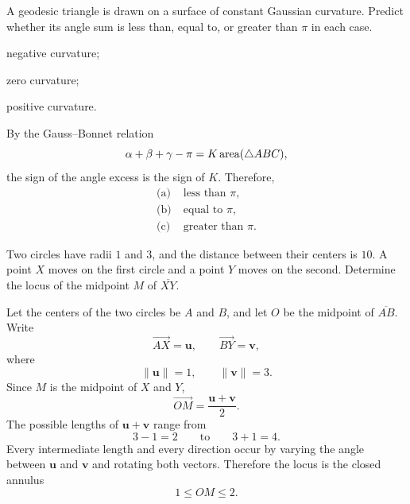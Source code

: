 
    \begin{expectedproblem}
        A geodesic triangle is drawn on a surface of constant Gaussian
        curvature. Predict whether its angle sum is less than, equal to, or
        greater than $\pi$ in each case.
        \begin{problemsubparts}
            \item negative curvature;
            \item zero curvature;
            \item positive curvature.
        \end{problemsubparts}
    \end{expectedproblem}

    \begin{solution}
        By the Gauss--Bonnet relation
        \[
            \alpha+\beta+\gamma-\pi
            =
            K\operatorname{area}(\triangle ABC),
        \]
        the sign of the angle excess is the sign of $K$. Therefore,
        \[
            \boxed{
                \begin{aligned}
                    \text{(a)}\;&\text{less than }\pi,\\
                    \text{(b)}\;&\text{equal to }\pi,\\
                    \text{(c)}\;&\text{greater than }\pi.
                \end{aligned}
            }
        \]
    \end{solution}

    \begin{expectedproblem}[1996 Putnam]
        Two circles have radii $1$ and $3$, and the distance between their
        centers is $10$. A point $X$ moves on the first circle and a point $Y$
        moves on the second. Determine the locus of the midpoint $M$ of
        $\overline{XY}$.
    \end{expectedproblem}

    \begin{solution}
        Let the centers of the two circles be $A$ and $B$, and let $O$ be the
        midpoint of $\overline{AB}$. Write
        \[
            \overrightarrow{AX}=\mathbf{u},
            \qquad
            \overrightarrow{BY}=\mathbf{v},
        \]
        where
        \[
            \|\mathbf{u}\|=1,
            \qquad
            \|\mathbf{v}\|=3.
        \]
        Since $M$ is the midpoint of $X$ and $Y$,
        \[
            \overrightarrow{OM}
            =
            \frac{\mathbf{u}+\mathbf{v}}{2}.
        \]
        The possible lengths of $\mathbf{u}+\mathbf{v}$ range from
        \[
            3-1=2
            \qquad\text{to}\qquad
            3+1=4.
        \]
        Every intermediate length and every direction occur by varying the
        angle between $\mathbf{u}$ and $\mathbf{v}$ and rotating both vectors.
        Therefore the locus is the closed annulus
        \[
            \boxed{1\leq OM\leq2}.
        \]
    \end{solution}

